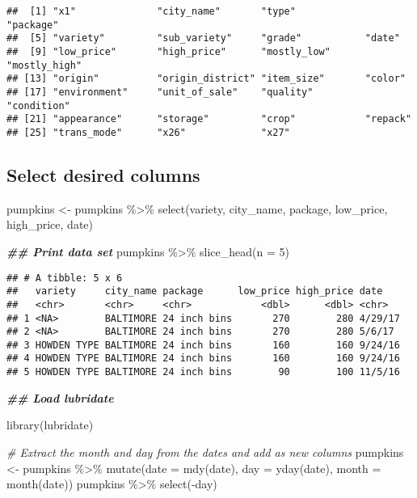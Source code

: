 \documentclass[
]{article}
\newenvironment{Shaded}{\begin{snugshade}}{\end{snugshade}}
\newcommand{\AttributeTok}[1]{\textcolor[rgb]{0.77,0.63,0.00}{#1}}
\newcommand{\CommentTok}[1]{\textcolor[rgb]{0.56,0.35,0.01}{\textit{#1}}}
\newcommand{\DecValTok}[1]{\textcolor[rgb]{0.00,0.00,0.81}{#1}}
\newcommand{\DocumentationTok}[1]{\textcolor[rgb]{0.56,0.35,0.01}{\textbf{\textit{#1}}}}
\newcommand{\FunctionTok}[1]{\textcolor[rgb]{0.00,0.00,0.00}{#1}}
\newcommand{\NormalTok}[1]{#1}
\newcommand{\OtherTok}[1]{\textcolor[rgb]{0.56,0.35,0.01}{#1}}
\newcommand{\SpecialCharTok}[1]{\textcolor[rgb]{0.00,0.00,0.00}{#1}}
\begin{document}
\begin{verbatim}
##  [1] "x1"              "city_name"       "type"            "package"        
##  [5] "variety"         "sub_variety"     "grade"           "date"           
##  [9] "low_price"       "high_price"      "mostly_low"      "mostly_high"    
## [13] "origin"          "origin_district" "item_size"       "color"          
## [17] "environment"     "unit_of_sale"    "quality"         "condition"      
## [21] "appearance"      "storage"         "crop"            "repack"         
## [25] "trans_mode"      "x26"             "x27"
\end{verbatim}

\hypertarget{select-desired-columns}{%
\subsection{Select desired columns}\label{select-desired-columns}}

\begin{Shaded}
\begin{Highlighting}[]
\NormalTok{pumpkins }\OtherTok{\textless{}{-}}\NormalTok{ pumpkins }\SpecialCharTok{\%\textgreater{}\%} \FunctionTok{select}\NormalTok{(variety, city\_name, package, low\_price, high\_price, date)}


\DocumentationTok{\#\# Print data set}
\NormalTok{pumpkins }\SpecialCharTok{\%\textgreater{}\%} \FunctionTok{slice\_head}\NormalTok{(}\AttributeTok{n =} \DecValTok{5}\NormalTok{)}
\end{Highlighting}
\end{Shaded}

\begin{verbatim}
## # A tibble: 5 x 6
##   variety     city_name package      low_price high_price date   
##   <chr>       <chr>     <chr>            <dbl>      <dbl> <chr>  
## 1 <NA>        BALTIMORE 24 inch bins       270        280 4/29/17
## 2 <NA>        BALTIMORE 24 inch bins       270        280 5/6/17 
## 3 HOWDEN TYPE BALTIMORE 24 inch bins       160        160 9/24/16
## 4 HOWDEN TYPE BALTIMORE 24 inch bins       160        160 9/24/16
## 5 HOWDEN TYPE BALTIMORE 24 inch bins        90        100 11/5/16
\end{verbatim}

\begin{Shaded}
\begin{Highlighting}[]
\DocumentationTok{\#\# Load lubridate}

\FunctionTok{library}\NormalTok{(lubridate)}

\CommentTok{\# Extract the month and day from the dates and add as new columns}
\NormalTok{pumpkins }\OtherTok{\textless{}{-}}\NormalTok{ pumpkins }\SpecialCharTok{\%\textgreater{}\%}
  \FunctionTok{mutate}\NormalTok{(}\AttributeTok{date =} \FunctionTok{mdy}\NormalTok{(date),  }
         \AttributeTok{day =} \FunctionTok{yday}\NormalTok{(date),}
         \AttributeTok{month =} \FunctionTok{month}\NormalTok{(date))}
\NormalTok{pumpkins }\SpecialCharTok{\%\textgreater{}\%} 
  \FunctionTok{select}\NormalTok{(}\SpecialCharTok{{-}}\NormalTok{day)}
\end{Highlighting}
\end{Shaded}
\end{document}

